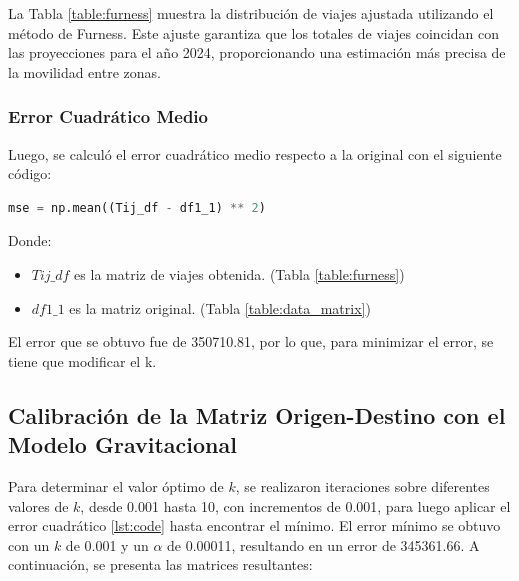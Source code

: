 \documentclass[letterpaper,12pt]{article}
\begin{document}
  \noindent La Tabla \ref{table:furness} muestra la distribución de viajes ajustada utilizando el método de Furness. Este ajuste garantiza que los totales de viajes coincidan con las proyecciones para el año 2024, proporcionando una estimación más precisa de la movilidad entre zonas.

\subsubsection{Error Cuadrático Medio}
Luego, se calculó el error cuadrático medio respecto a la original con el siguiente código:


\begin{lstlisting}[language=Python, label={lst:code}]
    mse = np.mean((Tij_df - df1_1) ** 2)
\end{lstlisting}

Donde:
\begin{itemize}
    \item $Tij\_df$ es la matriz de viajes obtenida. (Tabla \ref{table:furness})
    \item $df1\_1$ es la matriz original. (Tabla \ref{table:data_matrix})
\end{itemize}

El error que se obtuvo fue de 350710.81, por lo que, para minimizar el error, se tiene que modificar el k.

\subsection{Calibración de la Matriz Origen-Destino con el Modelo Gravitacional}
Para determinar el valor óptimo de \( k \), se realizaron iteraciones sobre diferentes valores de \( k \), desde 0.001 hasta 10, con incrementos de 0.001, para luego aplicar el error cuadrático \ref{lst:code} hasta encontrar el mínimo. El error mínimo se obtuvo con un \( k \) de 0.001 y un \( \alpha \) de 0.00011, resultando en un error de 345361.66. A continuación, se presenta las matrices resultantes:
\end{document}

